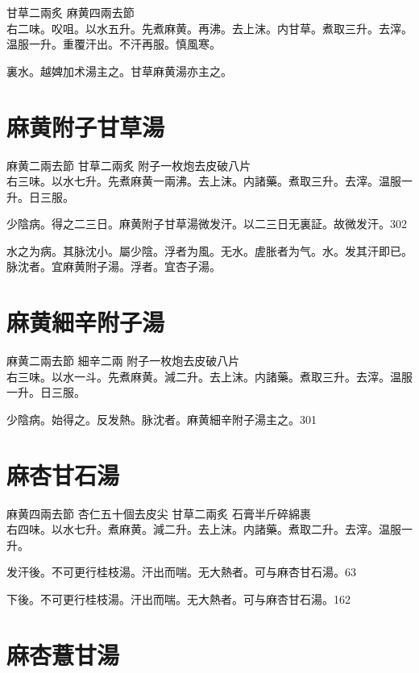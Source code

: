 甘草{\scriptsize 二兩炙} 麻黄{\scriptsize 四兩去節}\\
右二味。㕮咀。以水五升。先煮麻黄。再沸。去上沫。内甘草。煮取三升。去滓。温服一升。重覆汗出。不汗再服。慎風寒。

裏水。越婢加术湯主之。甘草麻黄湯亦主之。

\section{麻黄附子甘草湯}

麻黄{\scriptsize 二兩去節} 甘草{\scriptsize 二兩炙} 附子{\scriptsize 一枚炮去皮破八片}\\
右三味。以水七升。先煮麻黄一兩沸。去上沫。内諸藥。煮取三升。去滓。温服一升。日三服。

少陰病。得之二三日。麻黄附子甘草湯微发汗。以二三日无{\khaaitp 裏}証。故微发汗。302

水之为病。其脉沈小。屬少陰。浮者为風。无水。虗胀者为气。水。发其汗即已。脉沈者。宜麻黄附子湯。浮者。宜杏子湯。

\section{麻黄細辛附子湯}

麻黄{\scriptsize 二兩去節} 細辛{\scriptsize 二兩} 附子{\scriptsize 一枚炮去皮破八片}\\
右三味。以水一斗。先煮麻黄。減二升。去上沫。内諸藥。煮取三升。去滓。温服一升。日三服。

少陰病。始得之。反发熱。脉沈者。麻黄細辛附子湯主之。301

\section{麻杏甘石湯}

麻黄{\scriptsize 四兩去節} 杏仁{\scriptsize 五十個去皮尖} 甘草{\scriptsize 二兩炙} 石膏{\scriptsize 半斤碎綿裹}\\
右四味。以水七升。煮麻黄。減二升。去上沫。内諸藥。煮取二升。去滓。温服一升。

发汗後。{\khaaitp 不可更行桂枝湯。}汗出而喘。无大熱者。可与麻杏甘石湯。63

下後。{\khaaitp 不可更行桂枝湯。}汗出而喘。无大熱者。可与麻杏甘石湯。162

\section{麻杏薏甘湯}

